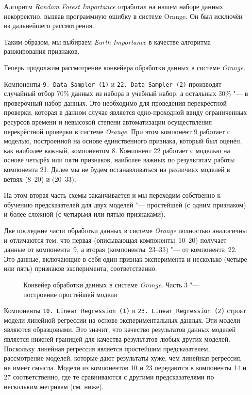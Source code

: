 Алгоритм \textit{Random Forest Importance} отработал на нашем наборе данных некорректно, вызвав программную ошибку в системе Orange. Он был исключён из дальнейшего рассмотрения.

Таким образом, мы выбираем \textit{Earth Importance} в качестве алгоритма ранжирования признаков.

Теперь продолжим рассмотрение конвейера обработки данных в системе \textit{Orange}.

Компоненты \texttt{9.\,Data~Sampler~(1)} и \texttt{22.\,Data~Sampler~(2)} производят случайный отбор 70\% данных из набора в учебный набор, а остальных 30\% "--- в проверочный набор данных. Это необходимо для проведения перекрёстной проверки, которая в данном случае является одно-проходной ввиду ограниченных ресурсов времени и невысокой степени автоматизации осуществления перекрёстной проверки в системе \textit{Orange}. При этом компонент 9 работает с моделью, построенной на основе единственного признака, который был оценён, как наиболее важный, компонентом 8. Компонент 22 работает с моделью на основе четырёх или пяти признаков, наиболее важных по результатам работы компонента 21. Далее мы не будем останавливаться на различиях моделей в ветвях (8--20) и (20--33).

На этом вторая часть схемы заканчивается и мы переходим собственно к обучению предсказателей для двух моделей "--- простейшей (с одним признаком) и более сложной (с четырьмя или пятью признаками).

Две последние части обработки данных в системе \textit{Orange} полностью аналогичны и отличаются тем, что первая (описывающая компоненты~10--20) получает данные от компонента~9, а вторая (компоненты~23--33) "--- от компонента~22. Это данные, включающие в себя один признак эксперимента и несколько (четыре или пять) признаков эксперимента, соответственно.

\begin{figure}
    \caption{Конвейер обработки данных в системе \textit{Orange}. Часть 3 "--- построение простейшей модели}
    \label{img:series30-3}
\end{figure}

Компоненты \texttt{10.\,Linear~Regression~(1)} и \texttt{23.\,Linear~Regression~(2)} строят модели линейной регрессии на основе экспериментальных данных. Эти модели являются образцовыми. Это значит, что качество результатов данных моделей является нижней границей для качества результатов любых других моделей. Поскольку линейная регрессия является простейшим предсказателем, рассмотрение моделей, которые дают результаты хуже, чем линейная регрессия, не имеет смысла. Модели из компонентов 10 и 23 передаются в компоненты 14 и 27 соответственно, где те сравниваются с другими предсказателями по нескольким метрикам (см. ниже).

